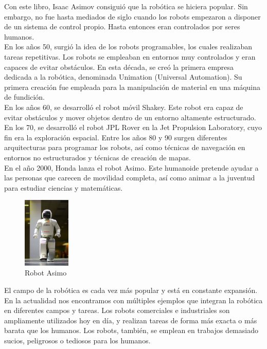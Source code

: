 Con este libro, Isaac Asimov consiguió que la robótica se hiciera popular. Sin embargo, no fue hasta mediados de siglo cuando los robots empezaron a disponer de un sistema de control propio. Hasta entonces eran controlados por seres humanos.\\

En los años 50, surgió la idea de los robots programables, los cuales realizaban tareas repetitivas. Los robots se empleaban en entornos muy controlados y eran capaces de evitar obstáculos. En esta década, se creó la primera empresa dedicada a la robótica, denominada Unimation (Universal Automation). Su primera creación fue empleada para la manipulación de material en una máquina de fundición.\\

En los años 60, se desarrolló el robot móvil Shakey. Este robot era capaz de evitar obstáculos y mover objetos dentro de un entorno altamente estructurado. En los 70, se desarrolló el robot JPL Rover en la Jet Propulsion Laboratory, cuyo fin era  la exploración espacial. Entre los años 80 y 90 surgen diferentes arquitecturas para programar los robots, así como técnicas de navegación en entornos no estructurados y técnicas de creación de mapas. \\

En el año 2000, Honda lanza el robot Asimo. Este humanoide pretende ayudar a las personas que carecen de movilidad completa, así como animar a la juventud para estudiar ciencias y matemáticas.\\

\begin{figure}[H]
  \begin{center}
    \includegraphics[width=0.2\textwidth]{figures/Introduccion/asimo.png}
		\caption{Robot Asimo}
		\label{fig.asimo}
		\end{center}
\end{figure}

El campo de la robótica es cada vez más popular y está en constante expansión. En la actualidad nos encontramos con múltiples ejemplos que integran la robótica en diferentes campos y tareas. Los robots comerciales e industriales son ampliamente utilizados hoy en día, y realizan tareas de forma más exacta o más barata que los humanos. Los robots, también, se emplean en trabajos demasiado sucios, peligrosos o tediosos para los humanos.\\

